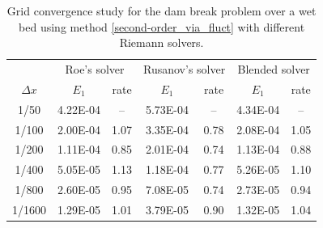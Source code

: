 \documentclass[preprint, 11pt]{article}
\begin{document}
\begin{table}[!ht]\scriptsize
  \begin{center}
    \begin{tabular}{||c||c|c||c|c||c|c||} \hline
      & \multicolumn{2}{c||}{Roe's solver}
      &\multicolumn{2}{c||}{Rusanov's solver}
      &\multicolumn{2}{c||}{Blended solver} \\ \cline{2-7}
      $\Delta x$ & $E_1$ & rate & $E_1$ & rate & $E_1$ & rate \\ \hline
      1/50   & 4.22E-04 &  --  & 5.73E-04 &  --  & 4.34E-04 & --   \\
      1/100  & 2.00E-04 & 1.07 & 3.35E-04 & 0.78 & 2.08E-04 & 1.05 \\
      1/200  & 1.11E-04 & 0.85 & 2.01E-04 & 0.74 & 1.13E-04 & 0.88 \\
      1/400  & 5.05E-05 & 1.13 & 1.18E-04 & 0.77 & 5.26E-05 & 1.10 \\
      1/800  & 2.60E-05 & 0.95 & 7.08E-05 & 0.74 & 2.73E-05 & 0.94 \\
      1/1600 & 1.29E-05 & 1.01 & 3.79E-05 & 0.90 & 1.32E-05 & 1.04 \\ \hline
    \end{tabular}
    \caption{Grid convergence study for the dam break problem over a wet bed
      using method \eqref{second-order_via_fluct} with different Riemann solvers.\label{table:rp_wet_bed}}
  \end{center}
\end{table}
\end{document}

